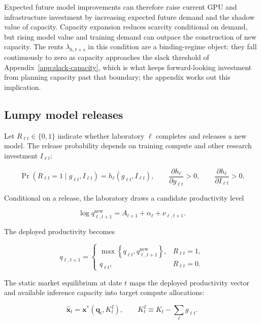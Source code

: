 \documentclass[11pt]{article}
\begin{document}
Expected future model improvements can therefore raise current GPU and infrastructure investment by increasing expected future demand and the shadow value of capacity. Capacity expansion reduces scarcity conditional on demand, but rising model value and training demand can outpace the construction of new capacity. The rents $\lambda_{h,t+s}$ in this condition are a binding-regime object: they fall continuously to zero as capacity approaches the slack threshold of Appendix~\ref{app:slack-capacity}, which is what keeps forward-looking investment from planning capacity past that boundary; the appendix works out this implication.

\subsection{Lumpy model releases}

Let $R_{\ell t}\in\{0,1\}$ indicate whether laboratory $\ell$ completes and releases a new model. The release probability depends on training compute and other research investment $I_{\ell t}$:

\begin{equation}\Pr\left(R_{\ell t}=1\mid g_{\ell t},I_{\ell t}\right)=h_\ell(g_{\ell t},I_{\ell t}),\qquad \frac{\partial h_\ell}{\partial g_{\ell t}}>0,\qquad \frac{\partial h_\ell}{\partial I_{\ell t}}>0.\end{equation}

Conditional on a release, the laboratory draws a candidate productivity level

\begin{equation}\log q_{\ell,t+1}^{\mathrm{new}}=A_{t+1}+\alpha_\ell+\nu_{\ell,t+1}.\end{equation}

The deployed productivity becomes

\begin{equation}q_{\ell,t+1}=\begin{cases}\max\left\{q_{\ell t},q_{\ell,t+1}^{\mathrm{new}}\right\},&R_{\ell t}=1,\\q_{\ell t},&R_{\ell t}=0.\end{cases}\end{equation}

The static market equilibrium at date $t$ maps the deployed productivity vector and available inference capacity into target compute allocations:

\begin{equation}\widehat{\mathbf x}_t=\mathbf x^*(\mathbf q_t,K_t^I),\qquad K_t^I\equiv K_t-\sum_\ell g_{\ell t}.\end{equation}
\end{document}
